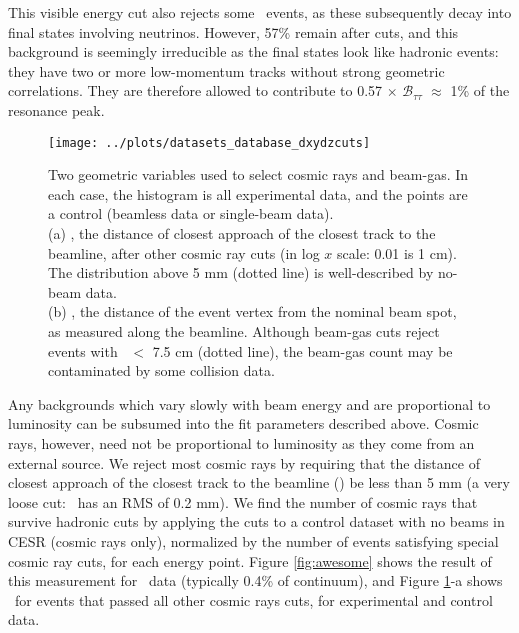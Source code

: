 \documentclass[aps,prd,preprint,superscriptaddress,tightenlines,nofootinbib,floatfix]{revtex4}
\begin{document}
This visible energy cut also rejects some \tautau\ events, as these
subsequently decay into final states involving neutrinos.  However,
57\% remain after cuts, and this background is seemingly irreducible
as the final states look like hadronic events: they have two or more
low-momentum tracks without strong geometric correlations.  They are
therefore allowed to contribute to 0.57 $\times$
$\mathcal{B}_{\tau\tau}$ $\approx$ 1\% of the resonance peak.

\begin{figure}[p]
  \texttt{[image: ../plots/datasets\_database\_dxydzcuts]}
  \caption{\label{fig:cosbg} Two geometric variables used to select
    cosmic rays and beam-gas.  In each case, the histogram is all
    experimental data, and the points are a control (beamless data or
    single-beam data). \vspace{0.2 cm} \\
    (a) \dxy, the distance of closest approach of the
    closest track to the beamline, after other cosmic ray cuts (in log
    $x$ scale: 0.01 is 1 cm).  The distribution above 5 mm (dotted
    line) is well-described by no-beam data. \vspace{0.2 cm} \\
    (b) \dz, the distance of the event vertex from the
    nominal beam spot, as measured along the beamline.  Although
    beam-gas cuts reject events with \dz\ $<$ 7.5 cm (dotted line), the
    beam-gas count may be contaminated by some collision data.}
\end{figure}

Any backgrounds which vary slowly with beam energy and are
proportional to luminosity can be subsumed into the fit parameters
described above.  Cosmic rays, however, need not be proportional to
luminosity as they come from an external source.  We reject most
cosmic rays by requiring that the distance of closest approach of the
closest track to the beamline (\dxy) be less than 5 mm (a very loose
cut: \dxy\ has an RMS of 0.2 mm).  We find the number of cosmic rays
that survive hadronic cuts by applying the cuts to a control dataset
with no beams in CESR (cosmic rays only), normalized by the number of
events satisfying special cosmic ray cuts, for each energy point.
Figure \ref{fig:awesome} shows the result of this measurement for
\uthree\ data (typically 0.4\% of continuum), and Figure
\ref{fig:cosbg}-a shows \dxy\ for events that passed all other cosmic
rays cuts, for experimental and control data.
\end{document}
